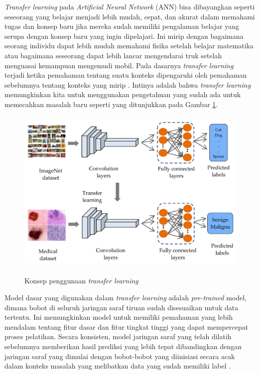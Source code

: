 \par \textit{Transfer learning} pada \textit{Artificial Neural Network} (ANN) bisa dibayangkan seperti seseorang yang belajar menjadi lebih mudah, cepat, dan akurat dalam memahami tugas dan konsep baru jika mereka sudah memiliki pengalaman belajar yang serupa dengan konsep baru yang ingin dipelajari. Ini mirip dengan bagaimana seorang individu dapat lebih mudah memahami fisika setelah belajar matematika atau bagaimana seseorang dapat lebih lancar mengendarai truk setelah menguasai kemampuan mengemudi mobil. Pada dasarnya \textit{transfer learning} terjadi ketika pemahaman tentang suatu konteks dipengaruhi oleh pemahaman sebelumnya tentang konteks yang mirip \citep{cirecsan2012transfer}. Intinya adalah bahwa \textit{transfer learning} memungkinkan kita untuk menggunakan pengetahuan yang sudah ada untuk memecahkan masalah baru seperti yang ditunjukkan pada Gambar \ref{transfer_learning}.

\begin{figure}[H]
\centering
{\includegraphics [width = 14cm, height= 8cm]{image/bab2/transfer-learning.png}}
\caption{Konsep penggunaan \textit{transfer learning} \citep{mukhlif2023incorporating}}
\label{transfer_learning}
\end{figure}

\par Model dasar yang digunakan dalam \textit{transfer learning} adalah \textit{pre-trained} model, dimana bobot di seluruh jaringan saraf tiruan sudah disesuaikan untuk data tertentu. Ini memungkinkan model untuk memiliki pemahaman yang lebih mendalam tentang fitur dasar dan fitur tingkat tinggi yang dapat mempercepat proses pelatihan. Secara konsisten, model jaringan saraf yang telah dilatih sebelumnya memberikan hasil prediksi yang lebih tepat dibandingkan dengan jaringan saraf yang dimulai dengan bobot-bobot yang diinisiasi secara acak dalam konteks masalah yang melibatkan data yang sudah memiliki label \citep{cirecsan2012transfer}.


